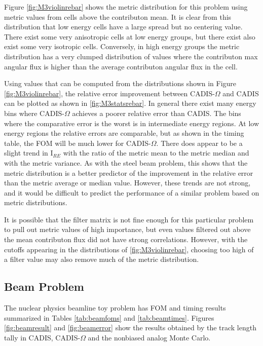 Figure \ref{fig:M3violinrebar} shows the metric
distribution for this problem using metric values from cells above the
contributon mean. It is clear from this distribution that low energy cells have
a large spread but no centering value. There exist some very anisotropic cells
at low energy groups, but there exist also exist some very isotropic cells.
Conversely, in high energy groups the metric distribution has a very clumped
distribution of values where the contributon max angular flux is higher than the
average contributon angular flux in the cell.

Using values that can be computed from the distributions shown in Figure
\ref{fig:M3violinrebar}, the relative error improvement between CADIS-$\Omega$
and CADIS can be plotted as shown in \ref{fig:M3statsrebar}. In general there
exist many energy bins where CADIS-$\Omega$ achieves a poorer relative error
than CADIS. The bins where the comparative error is the worst is in intermediate
energy regions. At low energy regions the relative errors are comparable, but as
shown in the timing table, the FOM will be much lower for CADIS-$\Omega$. There
does appear to be a slight trend in I$_{RE}$ with the ratio of the metric mean
to the metric median and with the metric variance. As with the steel beam
problem, this shows that the metric distribution is a better predictor of the
improvement in the relative error than the metric average or median value.
However, these trends are not strong, and it would be difficult to predict the
performance of a similar problem based on metric distributions.

It is possible that the filter matrix is not fine enough for this particular
problem to pull out metric
values of high importance, but even values filtered out above the mean
contributon flux did not have strong correlations. However, with the cutoffs
appearing in the distributions of \ref{fig:M3violinrebar}, choosing too high of
a filter value may also remove much of the metric distribution.

\subsection{Beam Problem}
\label{subsec:resultsbeam}

The nuclear physics beamline toy problem has FOM and timing
results summarized in Tables
\ref{tab:beamfoms} and \ref{tab:beamtimes}. Figures
\ref{fig:beamresult} and \ref{fig:beamerror} show the results obtained
by the track length tally in CADIS, CADIS-$\Omega$ and the nonbiased analog
Monte Carlo.

